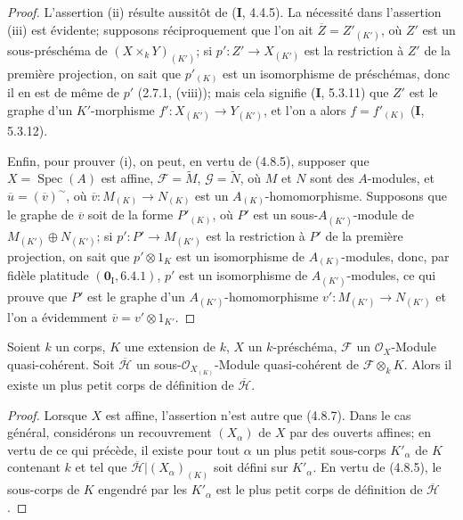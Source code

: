 \begin{proof}
L'assertion (ii) résulte aussitôt de (\textbf{I}, 4.4.5). La nécessité dans l'assertion
(iii) est évidente; supposons réciproquement que l'on ait
$\overline Z=Z'_{(K')}$, où $Z'$ est un sous-préschéma de
$(X\times_kY)_{(K')}$; si $p':Z'\to X_{(K')}$ est la restriction à $Z'$ de la
première projection, on sait que $p'_{(K)}$ est un isomorphisme de préschémas,
donc il en est de même de $p'$ (2.7.1, (viii)); mais cela signifie (\textbf{I}, 5.3.11)
que $Z'$ est le graphe d'un $K'$-morphisme
$f':X_{(K')}\to Y_{(K')}$, et l'on a alors
$f=f'_{(K)}$ (\textbf{I}, 5.3.12).

Enfin, pour prouver (i), on peut, en vertu de (4.8.5), supposer que
$X=\operatorname{Spec}(A)$ est affine, $\mathscr F=\widetilde M$,
$\mathscr G=\widetilde N$, où $M$ et $N$ sont des $A$-modules, et
$\overline u=(\overline v)^{\sim}$, où
$\overline v:M_{(K)}\to N_{(K)}$ est un $A_{(K)}$-homomorphisme. Supposons
que le graphe de $\overline v$ soit de la forme $P'_{(K)}$, où $P'$ est un
sous-$A_{(K')}$-module de $M_{(K')}\oplus N_{(K')}$; si
$p':P'\to M_{(K')}$ est la restriction à $P'$ de la première projection, on
sait que $p'\otimes1_K$ est un isomorphisme de $A_{(K)}$-modules, donc, par
fidèle platitude $(\mathbf{0}_{\mathrm I},6.4.1)$, $p'$ est un isomorphisme de
$A_{(K')}$-modules, ce qui prouve que $P'$ est le graphe d'un
$A_{(K')}$-homomorphisme $v':M_{(K')}\to N_{(K')}$ et l'on a évidemment
$\overline v=v'\otimes1_{K'}$.
\end{proof}

\begin{proposition}[4.8.9]
\label{IV.2.4.8.9-fr}
Soient $k$ un corps, $K$ une extension de $k$, $X$ un $k$-préschéma,
$\mathscr F$ un $\mathcal O_X$-Module quasi-cohérent. Soit $\overline{\mathscr H}$ un
sous-$\mathcal O_{X_{(K)}}$-Module quasi-cohérent de
$\mathscr F\otimes_kK$. Alors il existe un plus petit corps de définition de
$\overline{\mathscr H}$.
\end{proposition}

\begin{proof}
Lorsque $X$ est affine, l'assertion n'est autre que (4.8.7). Dans le cas
général, considérons un recouvrement $(X_\alpha)$ de $X$ par des ouverts
affines; en vertu de ce qui précède, il existe pour tout $\alpha$ un plus petit
sous-corps $K'_\alpha$ de $K$ contenant $k$ et tel que
$\overline{\mathscr H}|(X_\alpha)_{(K)}$ soit défini sur $K'_\alpha$. En vertu de
(4.8.5), le sous-corps de $K$ engendré par les $K'_\alpha$ est le plus petit
corps de définition de $\overline{\mathscr H}$.
\end{proof}

